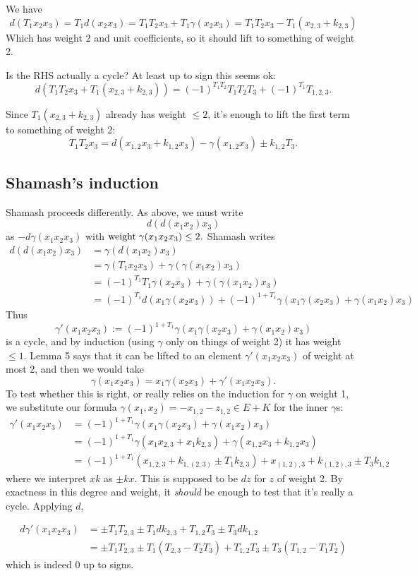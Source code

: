\documentclass[11pt]{amsart}
\def\g{{\gamma}}
\def\w{{\rm weight}}
\begin{document}
We have 
$$
d(T_1x_2x_3) = T_1d(x_2x_3) = T_1T_2x_3+T_1\g(x_{2}x_3) = T_1T_2x_3-T_1(x_{2,3}+k_{2,3})
$$
Which has weight 2 and unit coefficients, so it should lift to something
of weight 2.

Is the RHS actually a cycle? At least up to sign this seems ok:
$$
d(T_1T_2x_3+T_1(x_{2,3}+k_{2,3})) = (-1)^{T_1T_2}T_1T_2T_3 + (-1)^{T_1}T_{1,2,3}.
$$

Since $ T_1(x_{2,3}+k_{2,3})$ already has weight $\leq 2$, it's enough to lift the first term to something of weight 2:
$$
T_1T_2x_{3} =  d(x_{1,2}x_{3}+k_{1,2}x_{3})-\g(x_{1,2}x_{3})\pm k_{1,2}T_{3}.
$$

\subsection{Shamash's induction} Shamash proceeds differently. As above, we must write 
$$
d(d(x_{1}x_{2})x_{3}) 
$$
as $-d\g(x_{1}x_{2}x_{3})$ with $\w\; \g(x_{1}x_{2}x_{3})\leq 2.$ 
Shamash writes
\begin{align*}
d(d(x_{1}x_{2})x_{3})  &= \gamma(d(x_{1}x_{2})x_{3})\\ 
&= \gamma(T_{1}x_{2}x_{3})+\g(\g(x_{1}x_{2})x_{3})\\ 
&= (-1)^{T_{1}} T_{1}\g(x_{2}x_{3})+\g(\g(x_{1}x_{2})x_{3})\\
&=(-1)^{T_{1}} d(x_{1}\g(x_{2}x_{3})) + (-1)^{1+T_{1}}\g(x_{1}\gamma(x_{2}x_{3})+\g(x_{1}x_{2})x_{3}) 
\end{align*}
Thus 
$$
\g'(x_{1}x_{2}x_{3}) := (-1)^{1+T_{1}}\g(x_{1}\gamma(x_{2}x_{3})+\g(x_{1}x_{2})x_{3})
$$
is a cycle, and by induction (using $\g$ only on things of weight 2) it has weight $\leq 1$.  Lemma 5 says that it can be lifted to an element $\g'(x_{1}x_{2}x_{3})$ of weight at most 2, and then we would take
$$
\g(x_{1}x_{2}x_{3}) = x_{1}\g(x_{2}x_{3}) +\g'(x_{1}x_{2}x_{3}).
$$
To test whether this is right, or really relies on the induction for $\g$ on weight 1, we substitute our formula
$\g(x_1,x_2)=-x_{1,2}-z_{1,2} \in E+K$ for the inner $\g$s:
\begin{align*}
\g'(x_{1}x_{2}x_{3}) &= (-1)^{1+T_{1}} \g(x_{1}\g(x_{2}x_{3})+\g(x_{1}x_{2})x_{3})\\
&= (-1)^{1+T_{1}}\g(x_{1}x_{2,3}+x_{1}k_{2,3}) + \g(x_{1,2}x_{3}+k_{1,2}x_{3})\\
&= (-1)^{1+T_{1}}(x_{1,2,3}+k_{1,(2,3)}\pm T_{1}k_{2,3})
+ x_{(1,2),3}+k_{(1,2),3}\pm T_{3}k_{1,2}
\end{align*}
where we interpret $xk$ as $\pm kx$. This is supposed to be $dz$ for $z$ of weight 2. By exactness in this
degree and weight, it \emph{should} be enough to test that it's really a cycle. Applying $d$,

\begin{align*}
 d\g'(x_{1}x_{2}x_{3}) &= \pm T_{1}T_{2,3}\pm T_{1}dk_{2,3} +T_{1,2}T_{3}\pm T_{3}dk_{1,2}\\
 &= \pm T_{1}T_{2,3}\pm T_{1}(T_{2,3}-T_{2}T_{3}) +T_{1,2}T_{3}\pm T_{3}(T_{1,2}-T_{1}T_{2})
\end{align*}
which is indeed 0 up to signs.
\end{document}
